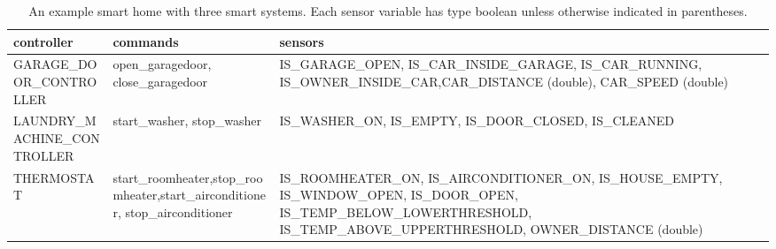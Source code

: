\documentclass{article}
\begin{document}
\begin{table}[t]
\begin{center}
\begin{tabular}{|p{4cm}|p{6cm}|p{4.5cm}|}
\hline
controller & commands & sensors \\ \hline
\tiny{GARAGE\_DOOR\_CONTROLLER} & 
\small{open\_garagedoor, close\_garagedoor}\tiny &  
\tiny{IS\_GARAGE\_OPEN, \newline IS\_CAR\_INSIDE\_GARAGE, \newline IS\_CAR\_RUNNING, \newline IS\_OWNER\_INSIDE\_CAR,\newline CAR\_DISTANCE (double), \newline CAR\_SPEED (double)} \\ \hline

\tiny{LAUNDRY\_MACHINE\_CONTROLLER} &
\small start\_washer, \small stop\_washer & 
\tiny{IS\_WASHER\_ON}, \newline \tiny{IS\_EMPTY, \newline IS\_DOOR\_CLOSED, \newline IS\_CLEANED} \\ \hline

\tiny{THERMOSTAT} & 
\small start\_roomheater,\newline \small stop\_roomheater,\newline\small start\_airconditioner, \newline \small stop\_airconditioner & 
\tiny{IS\_ROOMHEATER\_ON}, \tiny{IS\_AIRCONDITIONER\_ON},
\tiny{IS\_HOUSE\_EMPTY, \newline IS\_WINDOW\_OPEN, \newline IS\_DOOR\_OPEN, IS\_TEMP\_BELOW\_LOWERTHRESHOLD, IS\_TEMP\_ABOVE\_UPPERTHRESHOLD}, \tiny{OWNER\_DISTANCE (double)}\\ \hline
\end{tabular}
\caption{\small{An example smart home with three smart systems. Each sensor variable has type boolean unless otherwise indicated in parentheses.}}
\label{table:appliance_sensor}
\end{center}
\end{table}
\end{document}
